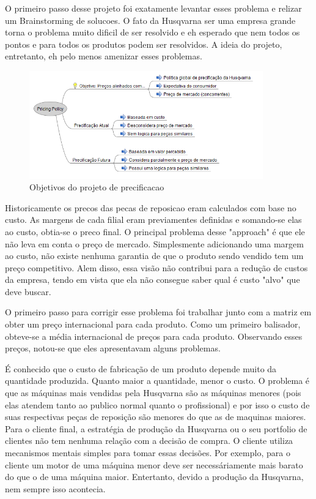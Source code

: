 \documentclass[12pt]{article}
\begin{document}
	O primeiro passo desse projeto foi exatamente levantar esses problema e relizar um Brainstorming de solucoes. O fato da Husqvarna ser uma empresa grande torna o problema muito dificil de ser resolvido e eh esperado que nem todos os pontos e para todos os produtos podem ser resolvidos. A ideia do projeto, entretanto, eh pelo menos amenizar esses problemas.

\begin{figure}[h!]
	\centering
	\includegraphics[width=0.9\textwidth]{img/pricing.png}
	\caption{Objetivos do projeto de precificacao}
	\label{pricing}
\end{figure}

	Historicamente os precos das pecas de reposicao eram calculados com base no custo. As margens de cada filial eram previamentes definidas e somando-se elas ao custo, obtia-se o preco final. O principal problema desse "approach" é que ele não leva em conta o preço de mercado. Simplesmente adicionando uma margem ao custo, não existe nenhuma garantia de que o produto sendo vendido tem um preço competitivo. Alem disso, essa visão não contribui para a redução de custos da empresa, tendo em vista que ela não consegue saber qual é custo "alvo" que deve buscar.

	O primeiro passo para corrigir esse problema foi trabalhar junto com a matriz em obter um preço internacional para cada produto. Como um primeiro balisador, obteve-se a média internacional de preços para cada produto. Observando esses preços, notou-se que eles apresentavam alguns problemas. 

	É conhecido que o custo de fabricação de um produto depende muito da quantidade produzida. Quanto maior a quantidade, menor o custo. O problema é que as máquinas mais vendidas pela Husqvarna são as máquinas menores (pois elas atendem tanto ao publico normal quanto o profissional) e por isso o custo de suas respectivas peças de reposição são menores do que as de maquinas maiores. Para o cliente final, a estratégia de produção da Husqvarna ou o seu portfolio de clientes não tem nenhuma relação com a decisão de compra. O cliente utiliza mecanismos mentais simples para tomar essas decisões. Por exemplo, para o cliente um motor de uma máquina menor deve ser necessáriamente mais barato do que o de uma máquina maior. Entertanto, devido a produção da Husqvarna, nem sempre isso acontecia.
\end{document}
